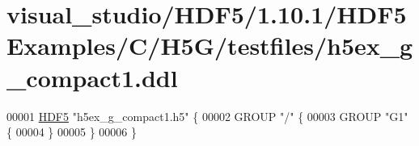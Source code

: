\hypertarget{visual__studio_2_h_d_f5_21_810_81_2_h_d_f5_examples_2_c_2_h5_g_2testfiles_2h5ex__g__compact1_8ddl_source}{}\section{visual\+\_\+studio/\+H\+D\+F5/1.10.1/\+H\+D\+F5\+Examples/\+C/\+H5\+G/testfiles/h5ex\+\_\+g\+\_\+compact1.ddl}
\label{visual__studio_2_h_d_f5_21_810_81_2_h_d_f5_examples_2_c_2_h5_g_2testfiles_2h5ex__g__compact1_8ddl_source}

\begin{DoxyCode}
00001 \hyperlink{namespace_h_d_f5}{HDF5} \textcolor{stringliteral}{"h5ex\_g\_compact1.h5"} \{
00002 GROUP \textcolor{stringliteral}{"/"} \{
00003    GROUP \textcolor{stringliteral}{"G1"} \{
00004    \}
00005 \}
00006 \}
\end{DoxyCode}
